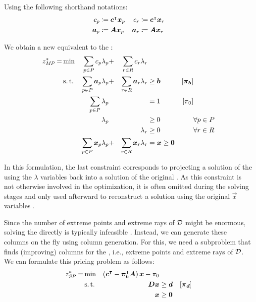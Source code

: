 Using the following shorthand notations:
\begin{equation}
\begin{aligned}
c_p &\coloneqq {\bm{c}}^\intercal {\bm{x}}_p
&c_r &\coloneqq {\bm{c}}^\intercal {\bm{x}}_r \\
{\bm{a}}_p &\coloneqq {\bm{A}} {\bm{x}}_p
&{\bm{a}}_r &\coloneqq {\bm{A}} {\bm{x}}_r
\end{aligned}
\end{equation}

We obtain a new \MP{} equivalent to the \LP{}:
\begin{equation}
\begin{aligned}
z^*_{\textit{MP}}{} = &\min & \sum_{p \in P} c_p \lambda_p &+ &\sum_{r \in R} c_r \lambda_r & & & \\
&\operatorname{s.t.} & \sum_{p \in P} {\bm{a}}_p \lambda_p &+ &\sum_{r \in R} {\bm{a}}_r \lambda_r & \geq {\bm{b}} & \left[{\bm{\pi}}_{\bm{b}}\right] \\
&& \sum_{p \in P} \lambda_p & & & = 1 & \left[\pi_0 \right] & \\
&& \lambda_p & & & \geq 0 & & \forall p \in P \\
&& & & \lambda_r & \geq 0 & & \forall r \in R \\
&& \sum_{p \in P} {\bm{x}}_p \lambda_p &+ &\sum_{r \in R} {\bm{x}}_r \lambda_r & = {\bm{x}} \geq {\bm{0}} & &
\end{aligned}
\end{equation}

In this formulation, the last constraint corresponds to projecting a solution of the \MP{} using the $\lambda$ variables back into a solution of the original \LP{}. As this constraint is not otherwise involved in the optimization, it is often omitted during the solving stages and only used afterward to reconstruct a solution using the original $\vec{x}$ variables \cite{thebook}.

Since the number of extreme points and extreme rays of $\mathcal{D}$ might be enormous, solving the \MP{} directly is typically infeasible \cite{thebook}. Instead, we can generate these columns on the fly using column generation. For this, we need a subproblem that finds (improving) columns for the \MP{}, i.e., extreme points and extreme rays of $\mathcal{D}$. We can formulate this pricing problem as follows:
\begin{equation}
\begin{aligned}
z^*_\SP{} = &\min & \left( \vec{c}\transpose - \vec{\pi}_\vec{b}\transpose \mat{A} \right) \vec{x} - \pi_0 & & \\
&\st & \mat{D} \vec{x} & \geq \vec{d} & \left[\vec{\pi}_\vec{d}\right] \\
&& \vec{x} & \geq \vec{0}
\end{aligned}
\end{equation}

